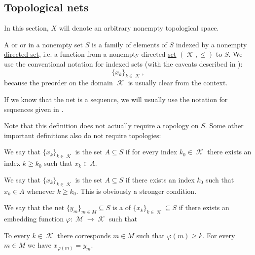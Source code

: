 \subsection{Topological nets}\label{subsec:topological_nets}

In this section, \( X \) will denote an arbitrary nonempty topological space.

\begin{definition}\label{def:topological_net}
  A  or  or  in a nonempty set \( S \) is a family of elements of \( S \) indexed by a nonempty \hyperref[def:indexed_family]{directed set}, i.e. a function from a nonempty directed \hyperref[def:directed_set]{set} \( (\mscrK, \leq) \) to \( S \). We use the conventional notation for indexed sets (with the caveats described in ):
  \begin{equation*}
    \{ x_k \}_{k \in \mscrK},
  \end{equation*}
  because the preorder on the domain \( \mscrK \) is usually clear from the context.

  If we know that the net is a sequence, we will usually use the notation for sequences given in .

  Note that this definition does not actually require a topology on \( S \). Some other important definitions also do not require topologies:
  \begin{thmenum}
     We say that \( \{ x_k \}_{k \in \mscrK} \) is  the set \( A \subseteq S \) if for every index \( k_0 \in \mscrK \) there exists an index \( k \geq k_0 \) such that \( x_k \in A \).

     We say that \( \{ x_k \}_{k \in \mscrK} \) is  the set \( A \subseteq S \) if there exists an index \( k_0 \) such that \( x_k \in A \) whenever \( k \geq k_0 \). This is obviously a stronger condition.

    We say that the net \( \{ y_m \}_{m \in M} \subseteq S \) is a  of \( \{ x_k \}_{k \in \mscrK} \subseteq S \) if there exists an embedding function \( \varphi: \mscrM \to \mscrK \) such that
    \begin{thmenum}
       To every \( k \in \mscrK \) there corresponds \( m \in M \) such that \( \varphi(m) \geq k \).
       For every \( m \in M \) we have \( x_{\varphi(m)} = y_m \).
    \end{thmenum}
  \end{thmenum}
\end{definition}

